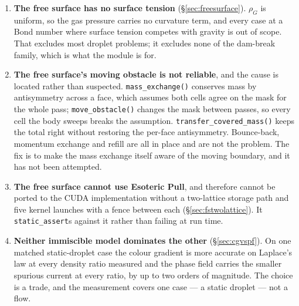 \documentclass[11pt,a4paper]{article}
\newcommand{\code}[1]{\texttt{\small #1}}
\begin{document}
\begin{enumerate}[leftmargin=1.4em,itemsep=4pt]
\item \textbf{The free surface has no surface tension} (\S\ref{sec:freesurface}).
  $\rho_G$ is uniform, so the gas pressure carries no curvature term, and every
  case at a Bond number where surface tension competes with gravity is out of
  scope. That excludes most droplet problems; it excludes none of the dam-break
  family, which is what the module is for.

\item \textbf{The free surface's moving obstacle is not reliable}, and the
  cause is located rather than suspected. \code{mass\_exchange()} conserves mass
  by antisymmetry across a face, which assumes both cells agree on the mask for
  the whole pass; \code{move\_obstacle()} changes the mask between passes, so
  every cell the body sweeps breaks the assumption.
  \code{transfer\_covered\_mass()} keeps the total right without restoring the
  per-face antisymmetry. Bounce-back, momentum exchange and refill are all in
  place and are not the problem. The fix is to make the mass exchange itself
  aware of the moving boundary, and it has not been attempted.

\item \textbf{The free surface cannot use Esoteric Pull}, and therefore cannot
  be ported to the CUDA implementation without a two-lattice storage path and
  five kernel launches with a fence between each (\S\ref{sec:fstwolattice}).
  It \code{static\_assert}s against it rather than failing at run time.

\item \textbf{Neither immiscible model dominates the other}
  (\S\ref{sec:cgvspf}). On one matched static-droplet case the colour gradient
  is more accurate on Laplace's law at every density ratio measured and the
  phase field carries the smaller spurious current at every ratio, by up to two
  orders of magnitude. The choice is a trade, and the measurement covers one
  case --- a static droplet --- not a flow.


\end{enumerate}
\end{document}
